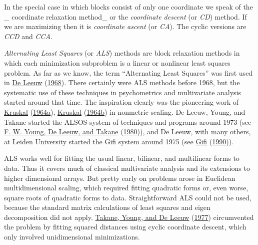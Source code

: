 \documentclass[
  12pt,
]{book}
\begin{document}
In the special case in which blocks consist of only one coordinate we speak of the
\_ coordinate relaxation method\_ or the
\emph{coordinate descent} (or \emph{CD}) method. If we are maximizing then it is \emph{coordinate ascent} (or \emph{CA}). The cyclic versions are \emph{CCD} and
\emph{CCA}.

\emph{Alternating Least Squares} (or \emph{ALS}) methods are block relaxation methods in which each minimization subproblem is a linear or nonlinear least squares problem. As far as we know, the term ``Alternating Least Squares'' was first used in \protect\hyperlink{ref-deleeuw_R_68d}{De Leeuw} (\protect\hyperlink{ref-deleeuw_R_68d}{1968}).
There certainly were ALS methods before 1968, but the systematic use of these techniques in psychometrics and multivariate analysis started around that time.
The inspiration clearly was the pioneering work of \protect\hyperlink{ref-kruskal_64a}{Kruskal} (\protect\hyperlink{ref-kruskal_64a}{1964a}), \protect\hyperlink{ref-kruskal_64b}{Kruskal} (\protect\hyperlink{ref-kruskal_64b}{1964b}) in nonmetric scaling.
De Leeuw, Young, and Takane started the ALSOS system of techniques and programs around 1973
(see \protect\hyperlink{ref-young_deleeuw_takane_C_80}{F. W. Young, De Leeuw, and Takane} (\protect\hyperlink{ref-young_deleeuw_takane_C_80}{1980})), and De Leeuw, with many others, at Leiden University started the Gifi system around 1975 (see \protect\hyperlink{ref-gifi_B_90}{Gifi} (\protect\hyperlink{ref-gifi_B_90}{1990})).

ALS works well for fitting the usual linear, bilinear, and multilinear forms to data. Thus it covers much of classical multivariate analysis and its extensions to higher dimensional arrays. But pretty early on problems arose in Euclidean multidimensional scaling, which required fitting quadratic forms or, even worse, square roots of quadratic forms to data. Straightforward ALS could not be used, because the standard matrix calculations of least squares and eigen decomposition did not apply. \protect\hyperlink{ref-takane_young_deleeuw_A_77}{Takane, Young, and De Leeuw} (\protect\hyperlink{ref-takane_young_deleeuw_A_77}{1977}) circumvented the problem by fitting squared distances using cyclic coordinate descent, which only involved unidimensional minimizations.
\end{document}
